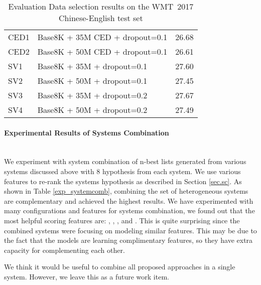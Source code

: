 \documentclass[a4paper]{article}
\begin{document}
\begin{CJK*}{UTF8}{gbsn}
\begin{table}[ht]
\begin{tabular}{@{}llr@{}}
\midrule
CED1 & Base8K + 35M CED + dropout=0.1   &  26.68 \\
CED2 & Base8K + 50M CED + dropout=0.1   & 26.61  \\
\midrule 
SV1 & Base8K + 35M + dropout=0.1 &  27.60\\
SV2 & Base8K + 50M + dropout=0.1 & 27.45\\
SV3 & Base8K + 35M + dropout=0.2 & 27.67\\
SV4 & Base8K + 50M + dropout=0.2 & 27.49\\
\bottomrule

\end{tabular}
\caption{Evaluation Data selection results on the WMT~2017 Chinese-English test set}
\label{exp_dataselect}
\end{table}


\paragraph{Experimental Results of Systems Combination}\mbox{}\\

We experiment with system combination of n-best lists generated from various systems discussed above with  8 hypothesis from each system. We use various features to re-rank the systems hypothesis as described in Section \ref{sec.sc}. 
As shown in Table \ref{exp_systemcomb}, combining the set of  heterogeneous systems are complementary and achieved the highest results. We have experimented with many configurations and features for systems combination, we found out that the most helpful scoring features are: , , ,    and . This is  quite surprising  since the combined systems were focusing on modeling similar features. This may be due to the fact that the models are learning complimentary features, so they have extra capacity for complementing each other.

We think it would be useful to combine all proposed approaches in a single system. However, we leave this as a future work item.





\end{CJK*}
\end{document}
